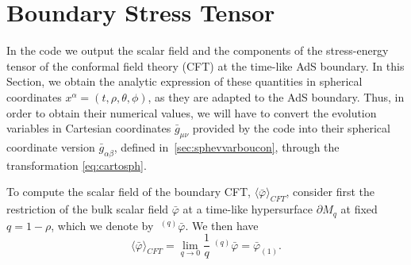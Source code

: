 \documentclass[a4paper,11pt]{article}
\numberwithin{equation}{section}
\begin{document}
\section{Boundary Stress Tensor}
\label{sec:bouset2}

In the code we output the scalar field and the components of the stress-energy tensor of the conformal field theory (CFT) at the time-like AdS boundary. In this Section, we obtain the analytic expression of these quantities in spherical coordinates $x^\alpha=(t,\rho,\theta,\phi)$, as they are adapted to the AdS boundary. Thus, in order to obtain their numerical values, we will have to convert the evolution variables in Cartesian coordinates $\bar{g}_{\mu\nu}$ provided by the code into their spherical coordinate version $\bar{g}_{\alpha\beta}$, defined in~\ref{sec:sphevvarboucon}, through the transformation \eqref{eq:cartosph}.

To compute the scalar field of the boundary CFT, $\langle \bar{\varphi}\rangle_{CFT}$, consider first the restriction of the bulk scalar field $\bar{\varphi}$ at a time-like hypersurface $\partial M_q$ at fixed $q=1-\rho$, which we denote by $\;^{(q)}\bar{\varphi}$. We then have 
\begin{equation}
\langle \bar{\varphi}\rangle_{CFT}=\lim_{q\to0}\frac{1}{q}  \;^{(q)}\bar{\varphi}=\bar{\varphi}_{(1)}.
\end{equation}
\end{document}
